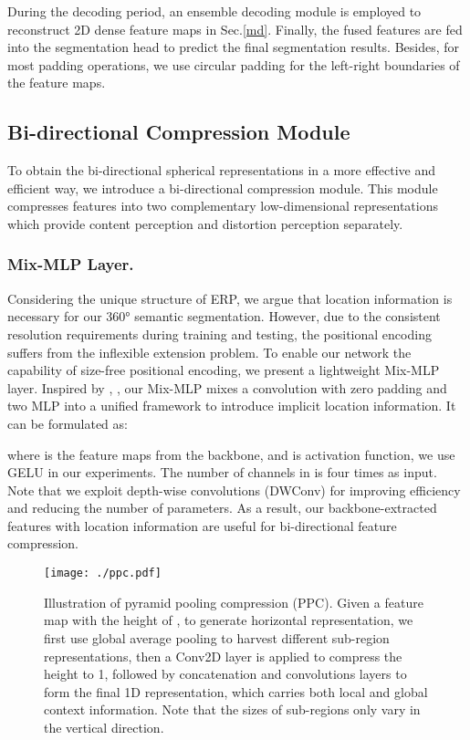 \documentclass[runningheads]{llncs}
\begin{document}
	
	During the decoding period, an ensemble decoding module  is employed to reconstruct 2D dense feature maps in Sec.\ref{md}.
	Finally, the fused features are fed into the segmentation head to predict the final segmentation results.
	Besides, for most padding operations, we use circular padding for the left-right boundaries of the feature maps.
	
	
	
	\subsection{Bi-directional Compression Module} \label{mc}
	
	To obtain the bi-directional spherical representations in a more effective and efficient way, we introduce a bi-directional compression module. This module compresses features into two complementary low-dimensional representations which provide content perception and distortion perception separately.
	
	\subsubsection{Mix-MLP Layer.}
	
	Considering the unique structure of ERP, we argue that location information is necessary for our 360° semantic segmentation.
	However, due to the consistent resolution requirements during training and testing, the positional encoding \cite{dosovitskiy2020image} suffers from the inflexible extension problem.
	To enable our network the capability of size-free positional encoding, we present a lightweight Mix-MLP layer.
	Inspired by \cite{chu2021conditional}, \cite{xie2021segformer}, our Mix-MLP mixes a  convolution with zero padding and two MLP into a unified framework to introduce implicit location information.
	It can be formulated as:
	
	where  is the feature maps from the backbone, and  is activation function, we use GELU in our experiments.
	The number of channels in  is four times as input.
	Note that we exploit depth-wise convolutions (DWConv) for improving efficiency and reducing the number of parameters.
	As a result, our backbone-extracted features with location information are useful for bi-directional feature compression.
	
	
	\begin{figure}[t]
		\centering
		\texttt{[image: ./ppc.pdf]}
		\caption{Illustration of pyramid pooling compression (PPC). Given a feature map  with the height of , to generate horizontal representation, we first use global average pooling to harvest different sub-region representations, then a Conv2D layer is applied to compress the height to 1, followed by concatenation and convolutions layers to form the final 1D representation, which carries both local and global context information. Note that the sizes of sub-regions only vary in the vertical direction.}
		\label{ppcm}
	\end{figure}
	
\end{document}
